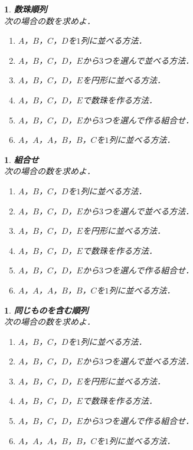 \documentclass[10pt,
fleqn,
dvipdfmx,
uplatex
]{jsarticle}
\newtheorem{question}[Question]{}
\begin{document}
\begin{question}{\bf\boldmath 数珠順列}\\
次の場合の数を求めよ．
\begin{enumerate}
\item $A$，$B$，$C$，$D$を$1$列に並べる方法．
\item $A$，$B$，$C$，$D$，$E$から$3$つを選んで並べる方法．
\item $A$，$B$，$C$，$D$，$E$を円形に並べる方法．
\item $A$，$B$，$C$，$D$，$E$で数珠を作る方法．
\item $A$，$B$，$C$，$D$，$E$から$3$つを選んで作る組合せ．
\item $A$，$A$，$A$，$B$，$B$，$C$を$1$列に並べる方法．
\end{enumerate}

\end{question}



\begin{question}{\bf\boldmath 組合せ}\\
次の場合の数を求めよ．
\begin{enumerate}
\item $A$，$B$，$C$，$D$を$1$列に並べる方法．
\item $A$，$B$，$C$，$D$，$E$から$3$つを選んで並べる方法．
\item $A$，$B$，$C$，$D$，$E$を円形に並べる方法．
\item $A$，$B$，$C$，$D$，$E$で数珠を作る方法．
\item $A$，$B$，$C$，$D$，$E$から$3$つを選んで作る組合せ．
\item $A$，$A$，$A$，$B$，$B$，$C$を$1$列に並べる方法．
\end{enumerate}

\end{question}



\begin{question}{\bf\boldmath 同じものを含む順列}\\
次の場合の数を求めよ．
\begin{enumerate}
\item $A$，$B$，$C$，$D$を$1$列に並べる方法．
\item $A$，$B$，$C$，$D$，$E$から$3$つを選んで並べる方法．
\item $A$，$B$，$C$，$D$，$E$を円形に並べる方法．
\item $A$，$B$，$C$，$D$，$E$で数珠を作る方法．
\item $A$，$B$，$C$，$D$，$E$から$3$つを選んで作る組合せ．
\item $A$，$A$，$A$，$B$，$B$，$C$を$1$列に並べる方法．
\end{enumerate}

\end{question}
\end{document}
